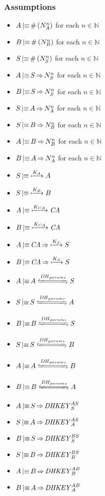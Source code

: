 \subsubsection{Assumptions}

\begin{itemize}
	\item \(A \operatorname{\mid\equiv} \#\left(N_A^n\right)\) for each \(n \in \mathbb{N}\)
	\item \(B \operatorname{\mid\equiv} \#\left(N_B^n\right)\) for each \(n \in \mathbb{N}\)
	\item \(S \operatorname{\mid\equiv} \#\left(N_S^n\right)\) for each \(n \in \mathbb{N}\)
	\item \(A \operatorname{\mid\equiv} S \operatorname{\Rightarrow} N_S^n\) for each \(n \in \mathbb{N}\)
	\item \(B \operatorname{\mid\equiv} S \operatorname{\Rightarrow} N_S^n\) for each \(n \in \mathbb{N}\)
	\item \(S \operatorname{\mid\equiv} A \operatorname{\Rightarrow} N_A^n\) for each \(n \in \mathbb{N}\)
	\item \(S \operatorname{\mid\equiv} B \operatorname{\Rightarrow} N_B^n\) for each \(n \in \mathbb{N}\)
	\item \(A \operatorname{\mid\equiv} B \operatorname{\Rightarrow} N_B^n\) for each \(n \in \mathbb{N}\)
	\item \(B \operatorname{\mid\equiv} A \operatorname{\Rightarrow} N_A^n\) for each \(n \in \mathbb{N}\)
	\item \(S \operatorname{\mid\equiv} \xmapsto{K_A} A\)
	\item \(S \operatorname{\mid\equiv} \xmapsto{K_B} B\)
	\item \(A \operatorname{\mid\equiv} \xmapsto{K_{CA}} \mathit{CA}\)
	\item \(B \operatorname{\mid\equiv} \xmapsto{K_{CA}} \mathit{CA}\)
	\item \(A \operatorname{\mid\equiv} \mathit{CA} \operatorname{\Rightarrow} \xmapsto{K_S} S\)
	\item \(B \operatorname{\mid\equiv} \mathit{CA} \operatorname{\Rightarrow} \xmapsto{K_S} S\)
	\item \(A \believes A \secret{\mathit{DH}_{params}} S\)
	\item \(S \believes S \secret{\mathit{DH}_{params}} A\)
	\item \(B \believes B \secret{\mathit{DH}_{params}} S\)
	\item \(S \believes S \secret{\mathit{DH}_{params}} B\)
	\item \(A \believes A \secret{\mathit{DH}_{params}} B\)
	\item \(B \believes B \secret{\mathit{DH}_{params}} A\)
	\item \(A \operatorname{\mid\equiv} S \operatorname{\Rightarrow} \mathit{DHKEY}_S^{AS}\)
	\item \(S \operatorname{\mid\equiv} A \operatorname{\Rightarrow} \mathit{DHKEY}_A^{AS}\)
	\item \(B \operatorname{\mid\equiv} S \operatorname{\Rightarrow} \mathit{DHKEY}_S^{BS}\)
	\item \(S \operatorname{\mid\equiv} B \operatorname{\Rightarrow} \mathit{DHKEY}_B^{BS}\)
	\item \(A \operatorname{\mid\equiv} B \operatorname{\Rightarrow} \mathit{DHKEY}_B^{AB}\)
	\item \(B \operatorname{\mid\equiv} A \operatorname{\Rightarrow} \mathit{DHKEY}_A^{AB}\)
\end{itemize}


